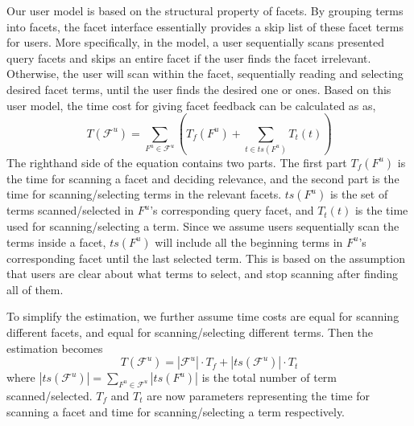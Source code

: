 Our user model is based on the structural property of facets. By grouping terms into facets, the facet interface essentially provides a skip list of these facet terms for users. More specifically, in the model, a user sequentially scans presented query facets and skips an entire facet if the user finds the facet irrelevant. Otherwise, the user will scan within the facet, sequentially reading and selecting desired facet terms, until the user finds the desired one or ones. Based on this user model, the time cost for giving facet feedback can be calculated as as,
\begin{equation}
 T(\mathcal{F}^u) = 
\sum_{F^u \in \mathcal{F}^u}{\left( T_f(F^u) + \sum_{t\in ts(F^u)}{T_t(t)} \right)} 
\end{equation}
The righthand side of the equation contains two parts. The first part $T_f(F^u)$ is the time for scanning a facet and deciding relevance, and the second part is the time for scanning/selecting terms in the relevant facets. $ts(F^u)$ is the set of terms scanned/selected in $F^u$'s corresponding query facet, and $T_t(t)$ is the time used for scanning/selecting a term. Since we assume users sequentially scan the terms inside a facet, $ts(F^u)$ will include all the beginning terms in $F^u$'s corresponding facet until the last selected term. This is based on the assumption that users are clear about what terms to select, and stop scanning after finding all of them.

To simplify the estimation, we further assume time costs are equal for scanning different facets, and equal for scanning/selecting different terms. Then the estimation becomes
\begin{equation}
 T(\mathcal{F}^u) = |\mathcal{F}^u|\cdot T_f + |ts(\mathcal{F}^u)|\cdot T_t
\end{equation}
where $|ts(\mathcal{F}^u)|=\sum_{F^u \in \mathcal{F}^u}{|ts(F^u)|}$ is the total number of term scanned/selected. $T_f$ and $T_t$ are now parameters representing the time for scanning a facet and time for scanning/selecting a term respectively.

